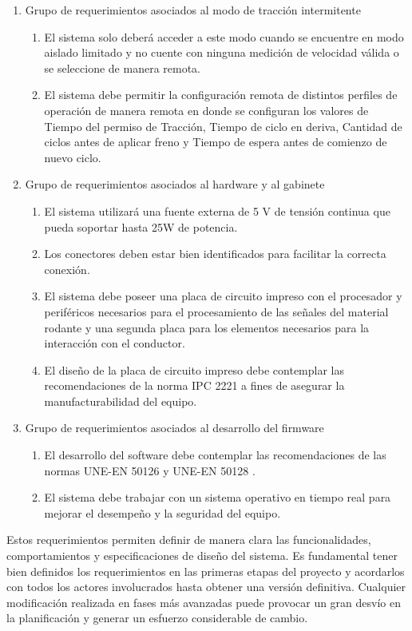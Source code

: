 \begin{enumerate}
    \item Grupo de requerimientos asociados al modo de tracción intermitente
    \begin{enumerate}
        \item El sistema solo deberá acceder a este modo cuando se encuentre en modo aislado limitado y no cuente con ninguna medición de velocidad válida o se seleccione de manera remota.
        \item El sistema debe permitir la configuración remota de distintos perfiles de operación de manera remota en donde se configuran los valores de Tiempo del permiso de Tracción, Tiempo de ciclo en deriva, Cantidad de ciclos antes de aplicar freno y Tiempo de espera antes de comienzo de nuevo ciclo.
    \end{enumerate}
       \vspace{1cm}
    \item Grupo de requerimientos asociados al hardware y al gabinete
    \begin{enumerate}
        \item El sistema utilizará una fuente externa de 5 V de tensión continua que pueda soportar hasta 25W de potencia.
        \item Los conectores deben estar bien identificados para facilitar la correcta conexión.
        \item El sistema debe poseer una placa de circuito impreso con el procesador y periféricos necesarios para el procesamiento de las señales del material rodante y una segunda placa para los elementos necesarios para la interacción con el conductor.
        \item El diseño de la placa de circuito impreso debe contemplar las recomendaciones de la norma IPC 2221 \cite{norma_ipc2221} a fines de asegurar la manufacturabilidad del equipo. 
    \end{enumerate}
           
    \item Grupo de requerimientos asociados al desarrollo del firmware
    \begin{enumerate}
        \item El desarrollo del software debe contemplar las recomendaciones de las normas UNE-EN 50126 y UNE-EN 50128 \cite{norma_50128}.
        \item El sistema debe trabajar con un sistema operativo en tiempo real para mejorar el desempeño y la seguridad del equipo.
    \end{enumerate}
\end{enumerate}



Estos requerimientos permiten definir de manera clara las funcionalidades, comportamientos y especificaciones de diseño del sistema. Es fundamental tener bien definidos los requerimientos en las primeras etapas del proyecto y acordarlos con todos los actores involucrados hasta obtener una versión definitiva. Cualquier modificación realizada en fases más avanzadas puede provocar un gran desvío en la planificación y generar un esfuerzo considerable de cambio.